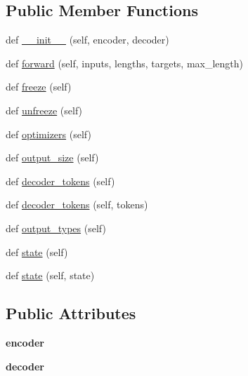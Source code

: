 \subsection*{Public Member Functions}
\begin{DoxyCompactItemize}
\item 
def \hyperlink{classmodels_1_1SeqToSeq_a0b60c54272e7d559194cef5d924aa5e7}{\+\_\+\+\_\+init\+\_\+\+\_\+} (self, encoder, decoder)
\item 
def \hyperlink{classmodels_1_1SeqToSeq_ac254a8bd8244bc3eda4c0f2a61f01e3d}{forward} (self, inputs, lengths, targets, max\+\_\+length)
\item 
def \hyperlink{classmodels_1_1SeqToSeq_ad21c67bc3bb798893b7cc588f233a6de}{freeze} (self)
\item 
def \hyperlink{classmodels_1_1SeqToSeq_ac8d3de12ffa7524c2223b29742d71196}{unfreeze} (self)
\item 
def \hyperlink{classmodels_1_1SeqToSeq_a5dcde3a4174987f934d6250112b4fb6c}{optimizers} (self)
\item 
def \hyperlink{classmodels_1_1SeqToSeq_ae502f52e4adbd9a0d6037a635531052d}{output\+\_\+size} (self)
\item 
def \hyperlink{classmodels_1_1SeqToSeq_ac7d4da59af2d99e715b577840deba80f}{decoder\+\_\+tokens} (self)
\item 
def \hyperlink{classmodels_1_1SeqToSeq_a1f9d544772bce628cfe0131391462fad}{decoder\+\_\+tokens} (self, tokens)
\item 
def \hyperlink{classmodels_1_1SeqToSeq_aea607a3cbc3e1fe5c36b9a178711a016}{output\+\_\+types} (self)
\item 
def \hyperlink{classmodels_1_1SeqToSeq_a0de756b7b636b74bff9b5069caa7122d}{state} (self)
\item 
def \hyperlink{classmodels_1_1SeqToSeq_af4130038b2f20880186c8732b08a1fd5}{state} (self, state)
\end{DoxyCompactItemize}
\subsection*{Public Attributes}
\begin{DoxyCompactItemize}
\item 
{\bfseries encoder}\hypertarget{classmodels_1_1SeqToSeq_a818388aa10b96e0dd0578f27138ad271}{}\label{classmodels_1_1SeqToSeq_a818388aa10b96e0dd0578f27138ad271}

\item 
{\bfseries decoder}\hypertarget{classmodels_1_1SeqToSeq_affda4e3f0a70a5577b9460ef89af8a9d}{}\label{classmodels_1_1SeqToSeq_affda4e3f0a70a5577b9460ef89af8a9d}

\end{DoxyCompactItemize}
